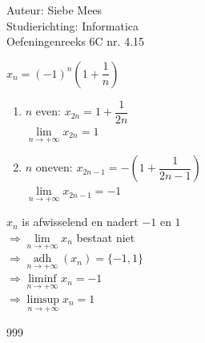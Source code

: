 \documentclass[a4paper]{article}
\begin{document}
  
\noindent \large Auteur: Siebe Mees \\
\noindent \large Studierichting: Informatica\\
\noindent \large Oefeningenreeks 6C nr. 4.15\\

\medskip

\normalsize

$x_n=(-1)^n\left(1+\dfrac{1}{n}\right)$\\

\begin{enumerate}

\item $n$ even: $x_{2n}=1+\dfrac{1}{2n}$\\

$\lim\limits_{n \rightarrow +\infty}x_{2n}=1$\\

\item $n$ oneven: $x_{2n-1}=-\left(1+\dfrac{1}{2n-1}\right)$\\

$\lim\limits_{n \rightarrow +\infty}x_{2n-1}=-1$\\

\end{enumerate}

$x_n$ is afwisselend en nadert $-1$ en $1$\\

$\Rightarrow \lim\limits_{n \rightarrow +\infty}x_n$ bestaat niet\\

$\Rightarrow \operatorname*{adh}\limits_{n \rightarrow +\infty}\left(x_n\right)=\{-1,1\}$\\

$\Rightarrow \liminf\limits_{n \rightarrow +\infty}x_n=-1$\\

$\Rightarrow \limsup\limits_{n \rightarrow +\infty}x_n=1$\\

\begin{thebibliography}{999}
\end{thebibliography}
\end{document}
